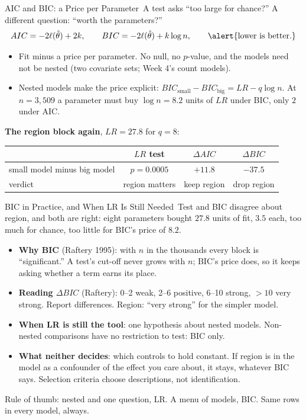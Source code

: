\documentclass[aspectratio=169,11pt,xcolor=dvipsnames]{beamer}
\newcommand{\srcp}[1]{{\scriptsize\color{gray}(#1)}}
\newcommand{\loglik}{\ell}
\newcommand{\core}{\,\raisebox{0.6pt}{\textcolor{corestar}{$\bigstar$}}}
\begin{document}
\begin{frame}{AIC and BIC: a Price per Parameter\core}
A test asks ``too large for chance?'' A different question: ``worth the
parameters?''
\begin{align*}
  AIC = -2\loglik(\hat\theta) + 2k ,
  \qquad
  BIC = -2\loglik(\hat\theta) + k\log n ,
  \qquad \alert{\text{lower is better.}}
\end{align*}
\begin{itemize}\itemsep3pt
  \item Fit minus a price per parameter. No null, no $p$-value, and the
        models need not be nested (two covariate sets; Week 4's count
        models).
  \item Nested models make the price explicit: $BIC_{\text{small}} -
        BIC_{\text{big}} = LR - q\log n$. At $n = 3{,}509$ a parameter must
        buy $\log n = 8.2$ units of $LR$ under BIC, only $2$ under AIC.
\end{itemize}
\vskip1pt
\textbf{The region block again}, $LR = 27.8$ for $q = 8$:
\begin{center}\small
\renewcommand{\arraystretch}{1.05}
\begin{tabular}{lccc}
\toprule
 & $LR$ test & $\Delta AIC$ & $\Delta BIC$ \\
\midrule
small model minus big model & $p = 0.0005$ & $+11.8$ & $-37.5$ \\
verdict & region matters & keep region & \alert{drop region} \\
\bottomrule
\end{tabular}
\end{center}
\end{frame}

\begin{frame}{BIC in Practice, and When LR Is Still Needed\core}
Test and BIC disagree about region, and both are right: eight parameters
bought $27.8$ units of fit, $3.5$ each, too much for chance, too little for
BIC's price of $8.2$.
\begin{itemize}\itemsep1pt
  \item \textbf{Why BIC} \srcp{Raftery 1995}: with $n$ in the thousands
        every block is ``significant.'' A test's cut-off never grows with
        $n$; BIC's price does, so it keeps asking whether a term earns its
        place.
  \item \textbf{Reading $\Delta BIC$} (Raftery): 0--2 weak, 2--6
        positive, 6--10 strong, $>10$ very strong. Report differences.
        Region: ``very strong'' for the simpler model.
  \item \textbf{When LR is still the tool}: one hypothesis about nested
        models. Non-nested comparisons have no restriction to test: BIC
        only.
  \item \textbf{What neither decides}: which controls to hold constant.
        If region is in the model as a confounder of the effect you care
        about, it stays, whatever BIC says. Selection criteria choose
        descriptions, not identification.
\end{itemize}
Rule of thumb: nested and one question, LR. A menu of models, BIC. Same
rows in every model, always.
\end{frame}
\end{document}

